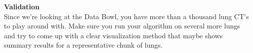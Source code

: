 \documentclass[10pt]{article}
\begin{document}
\clearpage
\noindent \Large \textbf{Validation} \normalsize \\
\noindent\makebox[\linewidth]{\rule{\textwidth}{0.4pt}}
Since we're looking at the Data Bowl, you have more than a thousand lung CT's to play around with.  Make sure you run your algorithm on several more lungs and try to come up with a clear visualization method that maybe shows summary results for a representative chunk of lungs.
\end{document}
